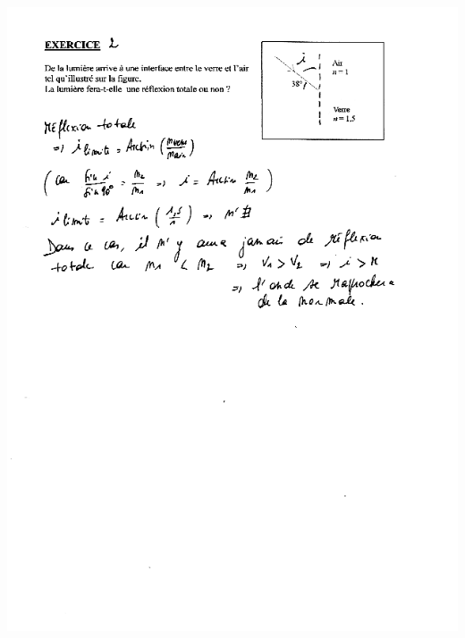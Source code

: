 \includegraphics[width=17.503cm,height=24.231cm]{Pictures/100000010000026F0000035EE9BF0781E67AA675.png}

